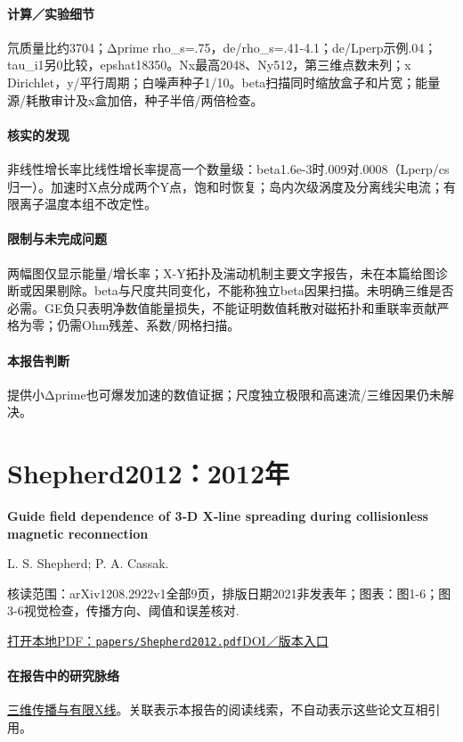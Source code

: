 \paragraph{计算／实验细节}氘质量比约3704；Δprime rho\_s=.75，de/rho\_s=.41-4.1；de/Lperp示例.04；tau\_i1另0比较，epshat18350。Nx最高2048、Ny512，第三维点数未列；x Dirichlet，y/平行周期；白噪声种子1/10。beta扫描同时缩放盒子和片宽；能量源/耗散审计及x盒加倍，种子半倍/两倍检查。

\paragraph{核实的发现}非线性增长率比线性增长率提高一个数量级：beta1.6e-3时.009对.0008（Lperp/cs归一）。加速时X点分成两个Y点，饱和时恢复；岛内次级涡度及分离线尖电流；有限离子温度本组不改定性。

\paragraph{限制与未完成问题}两幅图仅显示能量/增长率；X-Y拓扑及湍动机制主要文字报告，未在本篇给图诊断或因果剔除。beta与尺度共同变化，不能称独立beta因果扫描。未明确三维是否必需。GE负只表明净数值能量损失，不能证明数值耗散对磁拓扑和重联率贡献严格为零；仍需Ohm残差、系数/网格扫描。

\paragraph{本报告判断}提供小Δprime也可爆发加速的数值证据；尺度独立极限和高速流/三维因果仍未解决。

\section{Shepherd2012：2012年}\label{paper:Shepherd2012}

\textbf{Guide field dependence of 3‐D X‐line spreading during collisionless magnetic reconnection}\citep{Shepherd2012}\

L. S. Shepherd;  P. A. Cassak.

\textsf{核读范围：}arXiv1208.2922v1全部9页，排版日期2021非发表年；\textsf{图表：}图1-6；图3-6视觉检查，传播方向、阈值和误差核对.

\href{run:papers/Shepherd2012.pdf}{打开本地PDF：\texttt{papers/Shepherd2012.pdf}}\quad\href{https://doi.org/10.1029/2012ja017867}{DOI／版本入口}

\paragraph{在报告中的研究脉络}\hyperref[story:three]{三维传播与有限X线}。关联表示本报告的阅读线索，不自动表示这些论文互相引用。


